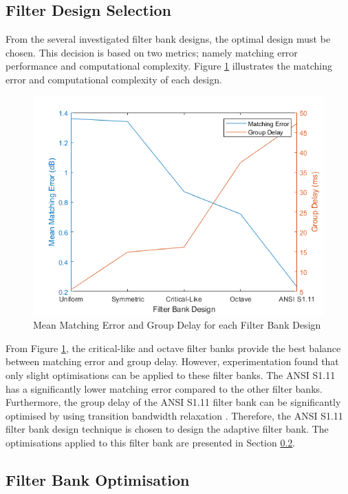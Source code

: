 \documentclass[11pt,onecolumn]{witseiepaper}
\begin{document}
\subsection{Filter Design Selection}
\label{sec:filtSelect}

\noindent From the several investigated filter bank designs, the optimal design must be chosen. This decision is based on two metrics; namely matching error performance and computational complexity. Figure \ref{fig:matErrDelay} illustrates the matching error and computational complexity of each design.

\begin{figure}[h]
\centering
\includegraphics[width=0.6\linewidth]{matErrDelay.PNG}
\caption{Mean Matching Error and Group Delay for each Filter Bank Design}
\label{fig:matErrDelay}
\end{figure}

\noindent From Figure \ref{fig:matErrDelay}, the critical-like and octave filter banks provide the best balance between matching error and group delay. However, experimentation found that only slight optimisations can be applied to these filter banks. The ANSI S1.11 has a significantly lower matching error compared to the other filter banks. Furthermore, the group delay of the ANSI S1.11 filter bank can be significantly optimised by using transition bandwidth relaxation \cite{chang}. Therefore, the ANSI S1.11 filter bank design technique is chosen to design the adaptive filter bank. The optimisations applied to this filter bank are presented in Section \ref{sec:filtBankOpt}.

\subsection{Filter Bank Optimisation}
\label{sec:filtBankOpt}
\end{document}
